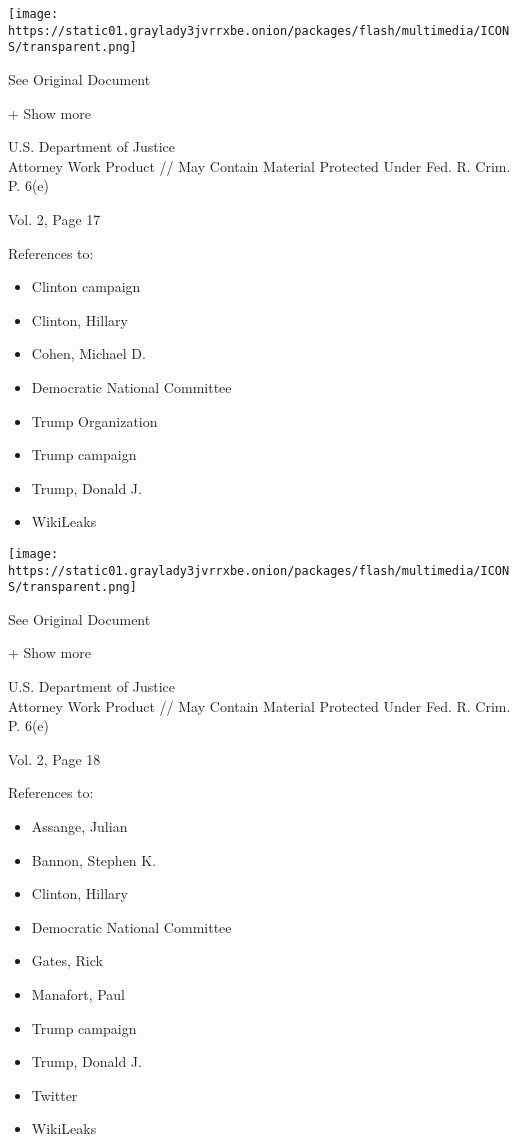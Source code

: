 \protect\hyperlink{}{}

\texttt{[image: https://static01.graylady3jvrrxbe.onion/packages/flash/multimedia/ICONS/transparent.png]}

See Original Document

+ Show more

U.S. Department of Justice\\
Attorney Work Product // May Contain Material Protected Under Fed. R.
Crim. P. 6(e)

Vol. 2, Page 17

References to:

\begin{itemize}
\tightlist
\item
  Clinton campaign
\item
  Clinton, Hillary
\item
  Cohen, Michael D.
\item
  Democratic National Committee
\item
  Trump Organization
\item
  Trump campaign
\item
  Trump, Donald J.
\item
  WikiLeaks
\end{itemize}

\protect\hyperlink{}{}

\texttt{[image: https://static01.graylady3jvrrxbe.onion/packages/flash/multimedia/ICONS/transparent.png]}

See Original Document

+ Show more

U.S. Department of Justice\\
Attorney Work Product // May Contain Material Protected Under Fed. R.
Crim. P. 6(e)

Vol. 2, Page 18

References to:

\begin{itemize}
\tightlist
\item
  Assange, Julian
\item
  Bannon, Stephen K.
\item
  Clinton, Hillary
\item
  Democratic National Committee
\item
  Gates, Rick
\item
  Manafort, Paul 
\item
  Trump campaign
\item
  Trump, Donald J.
\item
  Twitter
\item
  WikiLeaks
\end{itemize}

